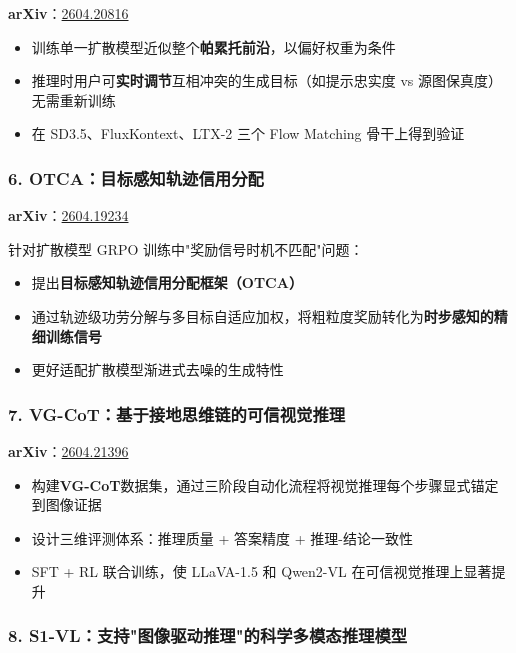 \textbf{arXiv}：\href{https://arxiv.org/abs/2604.20816}{2604.20816}

\begin{itemize}[leftmargin=1.5em]
  \item 训练单一扩散模型近似整个\textbf{帕累托前沿}，以偏好权重为条件
  \item 推理时用户可\textbf{实时调节}互相冲突的生成目标（如提示忠实度 vs 源图保真度）无需重新训练
  \item 在 SD3.5、FluxKontext、LTX-2 三个 Flow Matching 骨干上得到验证
\end{itemize}

\subsubsection{6. OTCA：目标感知轨迹信用分配}

\textbf{arXiv}：\href{https://arxiv.org/abs/2604.19234}{2604.19234}

针对扩散模型 GRPO 训练中"奖励信号时机不匹配"问题：

\begin{itemize}[leftmargin=1.5em]
  \item 提出\textbf{目标感知轨迹信用分配框架（OTCA）}
  \item 通过轨迹级功劳分解与多目标自适应加权，将粗粒度奖励转化为\textbf{时步感知的精细训练信号}
  \item 更好适配扩散模型渐进式去噪的生成特性
\end{itemize}

\subsubsection{7. VG-CoT：基于接地思维链的可信视觉推理}

\textbf{arXiv}：\href{https://arxiv.org/abs/2604.21396}{2604.21396}

\begin{itemize}[leftmargin=1.5em]
  \item 构建\textbf{VG-CoT}数据集，通过三阶段自动化流程将视觉推理每个步骤显式锚定到图像证据
  \item 设计三维评测体系：推理质量 + 答案精度 + 推理-结论一致性
  \item SFT + RL 联合训练，使 LLaVA-1.5 和 Qwen2-VL 在可信视觉推理上显著提升
\end{itemize}

\subsubsection{8. S1-VL：支持"图像驱动推理"的科学多模态推理模型}


